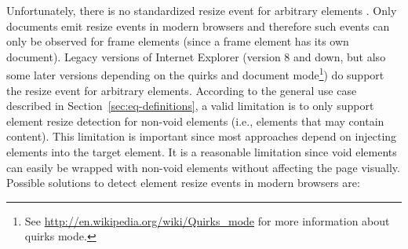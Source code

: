 \documentclass[a4paper,11pt]{kth-mag}
\begin{document}
        Unfortunately, there is no standardized resize event for arbitrary \glspl{element} \cite{w3c_dom2_events}.
        Only \glspl{document} emit resize events in modern browsers and therefore such events can only be observed for frame \glspl{element} (since a frame \gls{element} has its own \gls{document}).
        Legacy versions of Internet Explorer (version 8 and down, but also some later versions depending on the quirks and \gls{document} mode\footnote{See \url{http://en.wikipedia.org/wiki/Quirks_mode} for more information about quirks mode.}) do support the resize event for arbitrary \glspl{element}.
        According to the general use case described in Section~\ref{sec:eq-definitions}, a valid limitation is to only support \gls{element} resize detection for non-void \glspl{element} (i.e., \glspl{element} that may contain content).
        This limitation is important since most approaches depend on injecting \glspl{element} into the target \gls{element}.
        It is a reasonable limitation since void \glspl{element} can easily be wrapped with non-void elements without affecting the page visually.
        Possible solutions to detect element resize events in modern \glspl{browser} are:
\end{document}
